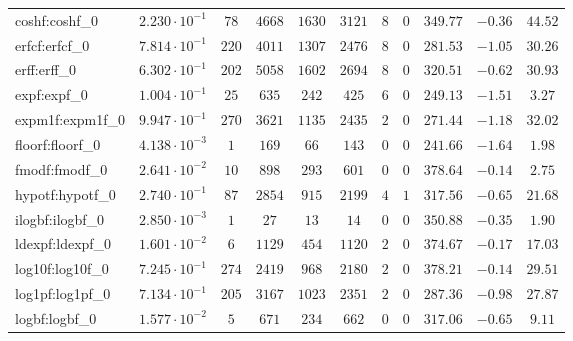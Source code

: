 \begin{tabular}{|l|c|c|c|c|c|c|c|c|c|c|}
coshf:coshf\_0               & $ 2.230 \cdot 10^{-1} $ & $ 78     $ & $ 4668  $ & $ 1630  $ & $ 3121  $ & $ 8   $ & $ 0 $ & $ 349.77      $ & $ -0.36   $ & $ 44.52   $ \\
erfcf:erfcf\_0               & $ 7.814 \cdot 10^{-1} $ & $ 220    $ & $ 4011  $ & $ 1307  $ & $ 2476  $ & $ 8   $ & $ 0 $ & $ 281.53      $ & $ -1.05   $ & $ 30.26   $ \\
erff:erff\_0                 & $ 6.302 \cdot 10^{-1} $ & $ 202    $ & $ 5058  $ & $ 1602  $ & $ 2694  $ & $ 8   $ & $ 0 $ & $ 320.51      $ & $ -0.62   $ & $ 30.93   $ \\
expf:expf\_0                 & $ 1.004 \cdot 10^{-1} $ & $ 25     $ & $ 635   $ & $ 242   $ & $ 425   $ & $ 6   $ & $ 0 $ & $ 249.13      $ & $ -1.51   $ & $ 3.27    $ \\
expm1f:expm1f\_0             & $ 9.947 \cdot 10^{-1} $ & $ 270    $ & $ 3621  $ & $ 1135  $ & $ 2435  $ & $ 2   $ & $ 0 $ & $ 271.44      $ & $ -1.18   $ & $ 32.02   $ \\
floorf:floorf\_0             & $ 4.138 \cdot 10^{-3} $ & $ 1      $ & $ 169   $ & $ 66    $ & $ 143   $ & $ 0   $ & $ 0 $ & $ 241.66      $ & $ -1.64   $ & $ 1.98    $ \\
fmodf:fmodf\_0               & $ 2.641 \cdot 10^{-2} $ & $ 10     $ & $ 898   $ & $ 293   $ & $ 601   $ & $ 0   $ & $ 0 $ & $ 378.64      $ & $ -0.14   $ & $ 2.75    $ \\
hypotf:hypotf\_0             & $ 2.740 \cdot 10^{-1} $ & $ 87     $ & $ 2854  $ & $ 915   $ & $ 2199  $ & $ 4   $ & $ 1 $ & $ 317.56      $ & $ -0.65   $ & $ 21.68   $ \\
ilogbf:ilogbf\_0             & $ 2.850 \cdot 10^{-3} $ & $ 1      $ & $ 27    $ & $ 13    $ & $ 14    $ & $ 0   $ & $ 0 $ & $ 350.88      $ & $ -0.35   $ & $ 1.90    $ \\
ldexpf:ldexpf\_0             & $ 1.601 \cdot 10^{-2} $ & $ 6      $ & $ 1129  $ & $ 454   $ & $ 1120  $ & $ 2   $ & $ 0 $ & $ 374.67      $ & $ -0.17   $ & $ 17.03   $ \\
log10f:log10f\_0             & $ 7.245 \cdot 10^{-1} $ & $ 274    $ & $ 2419  $ & $ 968   $ & $ 2180  $ & $ 2   $ & $ 0 $ & $ 378.21      $ & $ -0.14   $ & $ 29.51   $ \\
log1pf:log1pf\_0             & $ 7.134 \cdot 10^{-1} $ & $ 205    $ & $ 3167  $ & $ 1023  $ & $ 2351  $ & $ 2   $ & $ 0 $ & $ 287.36      $ & $ -0.98   $ & $ 27.87   $ \\
logbf:logbf\_0               & $ 1.577 \cdot 10^{-2} $ & $ 5      $ & $ 671   $ & $ 234   $ & $ 662   $ & $ 0   $ & $ 0 $ & $ 317.06      $ & $ -0.65   $ & $ 9.11    $ \\

\end{tabular}
